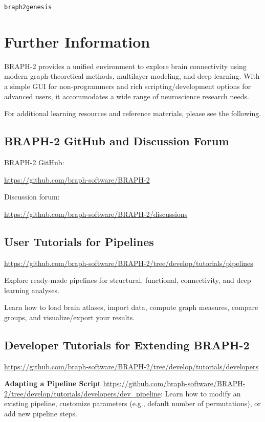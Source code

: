 \documentclass[justified]{tufte-handout}
\begin{document}
\lstinline{braph2genesis}

\section{Further Information}

BRAPH-2 provides a unified environment to explore brain connectivity using modern graph-theoretical methods, multilayer modeling, and deep learning. 
With a simple GUI for non-programmers and rich scripting/development options for advanced users, it accommodates a wide range of neuroscience research needs.

For additional learning resources and reference materials, please see the following.

\subsection{BRAPH-2 GitHub and Discussion Forum}

BRAPH-2 GitHub:

\url{https://github.com/braph-software/BRAPH-2}

\noindent Discussion forum:

\url{https://github.com/braph-software/BRAPH-2/discussions}

\subsection{User Tutorials for Pipelines}

\url{https://github.com/braph-software/BRAPH-2/tree/develop/tutorials/pipelines}

Explore ready-made pipelines for structural, functional, connectivity, and deep learning analyses.

Learn how to load brain atlases, import data, compute graph measures, compare groups, and visualize/export your results.


\subsection{Developer Tutorials for Extending BRAPH-2}

\url{https://github.com/braph-software/BRAPH-2/tree/develop/tutorials/developers}

\textbf{Adapting a Pipeline Script} \url{https://github.com/braph-software/BRAPH-2/tree/develop/tutorials/developers/dev_pipeline}:  
Learn how to modify an existing pipeline, customize parameters (e.g., default number of permutations), or add new pipeline steps.
\end{document}
